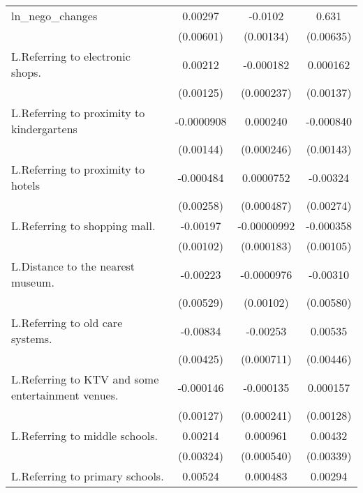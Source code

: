 {\begin{tabular}{l*{3}{c}}
\addlinespace
ln\_nego\_changes     &     0.00297         &     -0.0102\sym{***}&       0.631\sym{***}\\
                    &   (0.00601)         &   (0.00134)         &   (0.00635)         \\
\addlinespace
L.Referring to electronic shops.&     0.00212\sym{*}  &   -0.000182         &    0.000162         \\
                    &   (0.00125)         &  (0.000237)         &   (0.00137)         \\
\addlinespace
L.Referring to proximity to kindergartens&  -0.0000908         &    0.000240         &   -0.000840         \\
                    &   (0.00144)         &  (0.000246)         &   (0.00143)         \\
\addlinespace
L.Referring to proximity to hotels&   -0.000484         &   0.0000752         &    -0.00324         \\
                    &   (0.00258)         &  (0.000487)         &   (0.00274)         \\
\addlinespace
L.Referring to shopping mall.&    -0.00197\sym{*}  & -0.00000992         &   -0.000358         \\
                    &   (0.00102)         &  (0.000183)         &   (0.00105)         \\
\addlinespace
L.Distance to the nearest museum.&    -0.00223         &  -0.0000976         &    -0.00310         \\
                    &   (0.00529)         &   (0.00102)         &   (0.00580)         \\
\addlinespace
L.Referring to old care systems.&    -0.00834\sym{*}  &    -0.00253\sym{***}&     0.00535         \\
                    &   (0.00425)         &  (0.000711)         &   (0.00446)         \\
\addlinespace
L.Referring to KTV and some entertainment venues.&   -0.000146         &   -0.000135         &    0.000157         \\
                    &   (0.00127)         &  (0.000241)         &   (0.00128)         \\
\addlinespace
L.Referring to middle schools.&     0.00214         &    0.000961\sym{*}  &     0.00432         \\
                    &   (0.00324)         &  (0.000540)         &   (0.00339)         \\
\addlinespace
L.Referring to primary schools.&     0.00524\sym{*}  &    0.000483         &     0.00294         \\

\end{tabular}}

